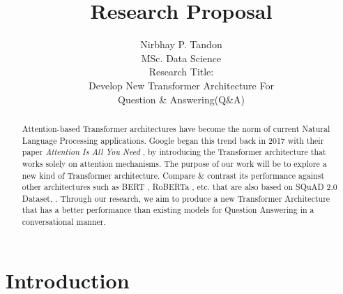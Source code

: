 \documentclass[11pt]{article}
\begin{document}
	
	\title{Research Proposal}
	
	\author{Nirbhay P. Tandon\\MSc. Data Science\\
		Research Title:\\Develop New Transformer Architecture For \\ Question \& Answering(Q\&A)
	}
	\date{}
	\maketitle
	
	\newpage
	\begin{abstract}
		Attention-based Transformer architectures have become the norm of current Natural Language Processing applications. Google began this trend back in 2017 with their paper \textit{Attention Is All You Need} \citep{atayl}, by introducing the Transformer architecture that works solely on attention mechanisms. The purpose of our work will be to explore a new kind of Transformer architecture. Compare \& contrast its performance against other architectures such as BERT \citep{bert}, RoBERTa \citep{roberta}, etc. that are also based on SQuAD 2.0 Dataset, \citep{dataset}. Through our research, we aim to produce a new Transformer Architecture that has a better performance than existing models for Question Answering in a conversational manner.
	\end{abstract}
	\newpage
	\tableofcontents
	\newpage
	\section{Introduction}\label{introduction}
	
\end{document}

